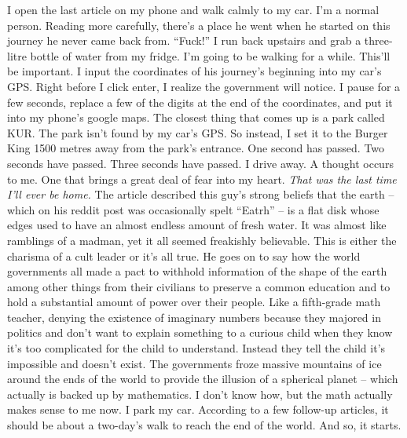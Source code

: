\documentclass[a4paper, 12pt]{book}
\newcommand\tab[1][1cm]{\hspace*{#1}}
\begin{document}
\newline
\tab
I open the last article on my phone and walk calmly to my car. I’m a normal person. Reading more carefully, there’s a place he went when he started on this journey he never came back from. “Fuck!” I run back upstairs and grab a three-litre bottle of water from my fridge. I’m going to be walking for a while. This’ll be important. I input the coordinates of his journey’s beginning into my car’s GPS. Right before I click enter, I realize the government will notice. I pause for a few seconds, replace a few of the digits at the end of the coordinates, and put it into my phone’s google maps. The closest thing that comes up is a park called KUR. 
\newline
\tab
The park isn’t found by my car’s GPS. So instead, I set it to the Burger King 1500 metres away from the park’s entrance. One second has passed. Two seconds have passed. Three seconds have passed. I drive away. A thought occurs to me. One that brings a great deal of fear into my heart. 
\newline
\tab
\textit{That was the last time I’ll ever be home.}
\newline
\tab
The article described this guy’s strong beliefs that the earth – which on his reddit post was occasionally spelt “Eatrh” – is a flat disk whose edges used to have an almost endless amount of fresh water. It was almost like ramblings of a madman, yet it all seemed freakishly believable. This is either the charisma of a cult leader or it’s all true. He goes on to say how the world governments all made a pact to withhold information of the shape of the earth among other things from their civilians to preserve a common education and to hold a substantial amount of power over their people. Like a fifth-grade math teacher, denying the existence of imaginary numbers because they majored in politics and don’t want to explain something to a curious child when they know it’s too complicated for the child to understand. Instead they tell the child it’s impossible and doesn’t exist. 
\newline
\tab
The governments froze massive mountains of ice around the ends of the world to provide the illusion of a spherical planet – which actually is backed up by mathematics. I don’t know how, but the math actually makes sense to me now. 
\newline
\tab
I park my car. According to a few follow-up articles, it should be about a two-day’s walk to reach the end of the world. And so, it starts. 
\newline
\end{document}
